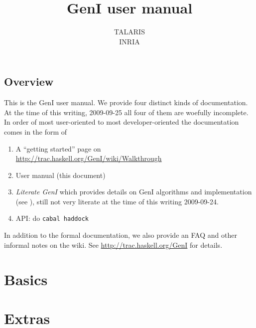 \documentclass[a4paper,11pt]{report}
\begin{document}
\title{GenI user manual}
\author{TALARIS\\INRIA}

\maketitle
\tableofcontents


\chapter{Overview}

This is the GenI user manual.  We provide four distinct kinds of
documentation.  At the time of this writing, 2009-09-25 all four of them
are woefully incomplete.  In order of most user-oriented to most
developer-oriented the documentation comes in the form of

\begin{enumerate}
\item A ``getting started'' page on\\
      \url{http://trac.haskell.org/GenI/wiki/Walkthrough}
\item User manual (this document)
\item \textit{Literate GenI} which provides details on GenI
      algorithms and implementation (see \cite{literateGeni}),
      still not very literate at the time of this writing
      2009-09-24.
\item API: do \verb!cabal haddock!
\end{enumerate}

In addition to the formal documentation, we also provide an FAQ and
other informal notes on the wiki.  See
\url{http://trac.haskell.org/GenI} for details.

\part{Basics}






\part{Extras}






{


}
\end{document}
